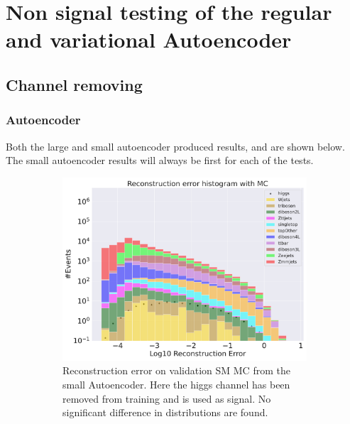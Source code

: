 \section{Non signal testing of the regular and variational Autoencoder}

\subsection*{Channel removing}
\subsubsection*{Autoencoder}
Both the large and small autoencoder produced results, and are shown below. The small autoencoder results will always be first for each of the tests. 


\begin{figure}[h!]
    \centering
    \begin{subfigure}{.45\textwidth}
        \includegraphics[width=\textwidth]{Figures/AE_testing/small/b_data_recon_big_rm3_feats_sig_higgs.pdf}
        \caption{Reconstruction error on validation SM MC from the small Autoencoder. Here the higgs channel has been removed from training and 
        is used as signal. No significant difference in distributions are found.}
        \label{fig:ae_small_higgs}
    \end{subfigure}
    \hfill 
    \begin{subfigure}{.45\textwidth}

\end{subfigure}
\end{figure}
